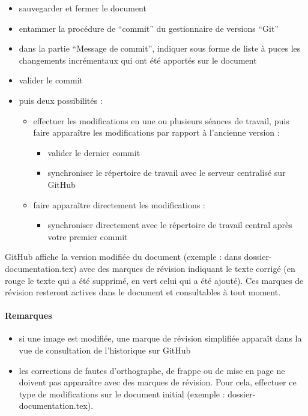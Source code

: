 \documentclass[a4paper]{article}
\begin{document}
\begin{itemize}
\item sauvegarder et fermer le document
\item entammer la procédure de ``commit'' du gestionnaire de versions ``Git''
\item dans la partie ``Message de commit'', indiquer sous forme de liste à puces les changements incrémentaux qui ont été apportés sur le document
\item valider le commit
\item puis deux possibilités :

\begin{itemize}
\item effectuer les modifications en une ou plusieurs séances de travail, puis faire apparaître les modifications par rapport à l'ancienne version :

\begin{itemize}
\item valider le dernier commit
\item synchroniser le répertoire de travail avec le serveur centralisé sur GitHub
\end{itemize}

\item faire apparaître directement les modifications :

\begin{itemize}
\item synchroniser directement avec le répertoire de travail central après votre premier commit
\end{itemize}

\end{itemize}
\end{itemize}

GitHub affiche la version modifiée du document (exemple : dans dossier-documentation.tex) avec des marques de révision indiquant le texte corrigé (en rouge le texte qui a été supprimé, en vert celui qui a été ajouté). Ces marques de révision resteront actives dans le document et consultables à tout moment.

\paragraph{Remarques}

\begin{itemize}
\item si une image est modifiée, une marque de révision simplifiée apparaît dans la vue de consultation de l'historique sur GitHub
\item les corrections de fautes d'orthographe, de frappe ou de mise en page ne doivent pas apparaître avec des marques de révision. Pour cela, effectuer ce type de modifications sur le document initial (exemple : dossier-documentation.tex).
\end{itemize}
\end{document}
